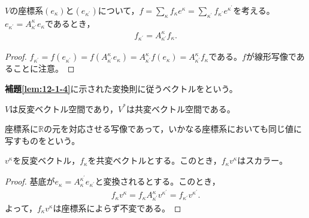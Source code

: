 \documentclass[uplatex]{jsarticle}
\begin{document}
\begin{hodai}[変換則]
  \label{lem:12-1-4}
  $V$の座標系$(e_{\kappa})$と$(e_{\kappa^{\prime}})$について，${\displaystyle f = \sum_{\kappa} f_{\kappa} e^{\kappa} = \sum_{\kappa^{\prime}} f_{\kappa^{\prime}} e^{\kappa^{\prime}}}$を考える。$e_{\kappa^{\prime}} = A_{\kappa^{\prime}}^{\kappa} e_{\kappa}$であるとき，
  \begin{align}
    f_{\kappa^{\prime}} = A_{\kappa^{\prime}}^{\kappa} f_{\kappa}.
  \end{align}
\end{hodai}

\begin{proof}
  $f_{\kappa^{\prime}} = f(e_{\kappa^{\prime}}) = f(A_{\kappa^{\prime}}^{\kappa}e_{\kappa}) = A_{\kappa^{\prime}}^{\kappa} f(e_{\kappa}) = A_{\kappa^{\prime}}^{\kappa} f_{\kappa}$である。$f$が線形写像であることに注意。
\end{proof}

\begin{teigi}
  \textbf{補題\ref{lem:12-1-4}}に示された変換則に従うベクトルをという。
\end{teigi}

\begin{remark}
  $V$は反変ベクトル空間であり，$V^{*}$は共変ベクトル空間である。
\end{remark}

\begin{teigi}
  座標系に$\mathbb{R}$の元を対応させる写像であって，いかなる座標系においても同じ値に写すものをという。
\end{teigi}

\begin{hodai}
  $v^{\kappa}$を反変ベクトル，$f_{\kappa}$を共変ベクトルとする。このとき，$f_{\kappa} v^{\kappa}$はスカラー。
\end{hodai}

\begin{proof}
  基底が$e_{\kappa} = A_{\kappa}^{\kappa^{\prime}} e_{\kappa^{\prime}}$と変換されるとする。このとき，
  \begin{align}
    f_{\kappa} v^{\kappa} = f_{\kappa} A^{\kappa}_{\kappa^{\prime}} v^{\kappa^{\prime}} = f_{\kappa^{\prime}} v^{\kappa^{\prime}}.
  \end{align}
  よって，$f_{\kappa} v^{\kappa}$は座標系によらず不変である。
\end{proof}
\end{document}
